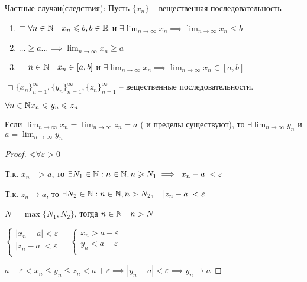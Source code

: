     Частные случаи(следствия):
    Пусть $\{x_n\}$ -- вещественная последовательность
    \begin{enumerate}
        \item $\sqsupset \forall n\in \mathbb{N} \quad x_n\leqslant b, b\in \mathbb{R}$ и $\exists \lim_{n \to \infty} x_n \implies \lim_{n \to \infty} x_n\leqslant b$
        \item $\ldots \geqslant a \ldots \implies  \lim_{n \to \infty} x_n\geqslant a$
        \item $\sqsupset n\in \mathbb{N} \quad x_{n} \in[a,b]$ и $\exists \lim_{n \to \infty} x_n \implies \lim_{n \to \infty} x_n\in [a,b]$
    \end{enumerate}

    \begin{theorem}
        $\sqsupset \{x_n\}_{n=1}^{\infty }, \{y_{n} \}_{n=1}^{\infty }, \{z_n\}_{n=1}^{\infty }$ -- вещественные последовательности.

        $\forall n\in \mathbb{N}  x_{n} \leqslant y_{n} \leqslant z_n$

        Если $\lim_{n \to \infty} x_n = \lim_{n \to \infty}  z_n = a $ ( и пределы существуют), то $\exists \lim_{n \to \infty} y_n$ и $a = \lim_{n \to \infty} y_{n} $
    \end{theorem}
    \begin{proof}
        $\sphericalangle\forall  \varepsilon>0$

        Т.к. $x_n -> a$, то $\exists N_1\in \mathbb{N} : n\in \mathbb{N} , n\geqslant N_1 \implies \left| x_n-a \right| <\varepsilon$

        Т.к. $z_n \to  a$, то $\exists N_2\in \mathbb{N} :n\in \mathbb{N} , n>N_2, \quad\left| z_n-a \right| <\varepsilon$

        $N = \max\{N_1, N_2\}$, тогда $n\in \mathbb{N} \quad n>N$

        $\begin{cases}
            \left| x_n-a \right| <\varepsilon\\
            \left| z_n-a \right| <\varepsilon\\
        \end{cases}\quad \begin{cases}
            x_n> a-\varepsilon\\
            y_n<a+\varepsilon\\
        \end{cases}$

        $a-\varepsilon <x_n\leqslant y_{n} \leqslant z_n<a+\varepsilon \implies \left| y_n-a \right| <\varepsilon \implies y_n\to a$
    \end{proof}
    
